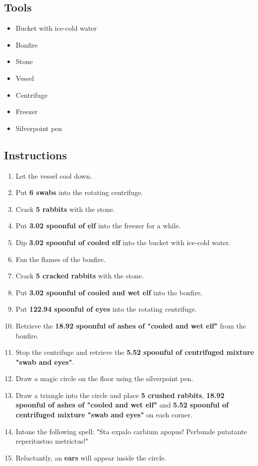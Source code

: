 \documentclass{article}
\begin{document}
\subsection{Tools}\begin{itemize}
\item 
Bucket with ice-cold water
\item 
Bonfire
\item 
Stone
\item 
Vessel
\item 
Centrifuge
\item 
Freezer
\item 
Silverpoint pen
\end{itemize}
\subsection{Instructions}\begin{enumerate}
\item 
Let the vessel cool down.
\item 
Put \textbf{6 swabs} into the rotating centrifuge.
\item 
Crack \textbf{5 rabbits} with the stone.
\item 
Put \textbf{3.02 spoonful of elf} into the freezer for a while.
\item 
Dip \textbf{3.02 spoonful of cooled elf} into the bucket with ice-cold water.
\item 
Fan the flames of the bonfire.
\item 
Crack \textbf{5 cracked rabbits} with the stone.
\item 
Put \textbf{3.02 spoonful of cooled and wet elf} into the bonfire.
\item 
Put \textbf{122.94 spoonful of eyes} into the rotating centrifuge.
\item 
Retrieve the \textbf{18.92 spoonful of ashes of "cooled and wet elf"} from the bonfire.
\item 
Stop the centrifuge and retrieve the \textbf{5.52 spoonful of centrifuged mixture "swab and eyes"}.
\item 
Draw a magic circle on the floor using the silverpoint pen.
\item 
Draw a triangle into the circle and place \textbf{5 crushed rabbits}, \textbf{18.92 spoonful of ashes of "cooled and wet elf"} and \textbf{5.52 spoonful of centrifuged mixture "swab and eyes"} on each corner.
\item 
Intone the following spell: "Sta expalo carbium apopus! Perbunde putatante reperitustuo metrictus!"
\item 
Reluctantly, an \textbf{ears} will appear inside the circle.
\end{enumerate}
\newpage
\end{document}

